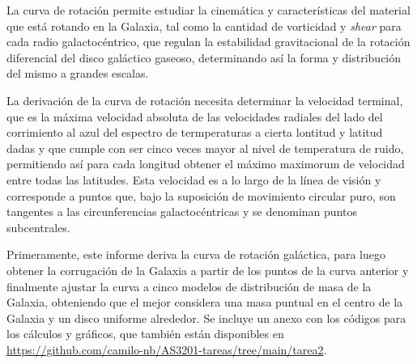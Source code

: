 La curva de rotación permite estudiar la cinemática y características del material que está rotando en la Galaxia, tal como la cantidad de vorticidad y \textit{shear} para cada radio galactocéntrico, que regulan la estabilidad gravitacional de la rotación diferencial del disco galáctico gaseoso, determinando así la forma y distribución del mismo a grandes escalas.

La derivación de la curva de rotación necesita determinar la velocidad terminal, que es la máxima velocidad absoluta de las velocidades radiales del lado del corrimiento al azul del espectro de termperaturas a cierta lontitud y latitud dadas y que cumple con ser cinco veces mayor al nivel de temperatura de ruido, permitiendo así para cada longitud obtener el máximo maximorum de velocidad entre todas las latitudes. Esta velocidad es a lo largo de la línea de visión y corresponde a puntos que, bajo la suposición de movimiento circular puro, son tangentes a las circunferencias galactocéntricas y se denominan puntos subcentrales.

Primeramente, este informe deriva la curva de rotación galáctica, para luego obtener la corrugación de la Galaxia a partir de los puntos de la curva anterior y finalmente ajustar la curva a cinco modelos de distribución de masa de la Galaxia, obteniendo que el mejor considera una masa puntual en el centro de la Galaxia y un disco uniforme alrededor. Se incluye un anexo con los códigos para los cálculos y gráficos, que también están disponibles en \url{https://github.com/camilo-nb/AS3201-tareas/tree/main/tarea2}.
